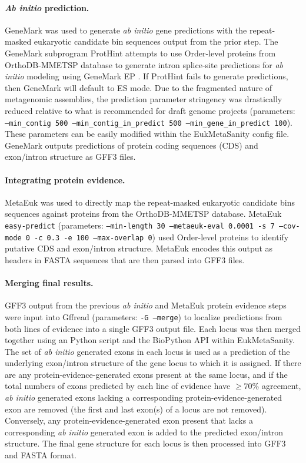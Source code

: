 \documentclass[12pt]{article}
\numberwithin{equation}{section}
\begin{document}
\paragraph{\textit{Ab initio} prediction.}  GeneMark \citep{Lomsadze2005} was used to generate \textit{ab initio} gene predictions with the repeat-masked eukaryotic candidate bin sequences output from the prior step. The GeneMark subprogram ProtHint attempts to use Order-level proteins from OrthoDB-MMETSP database to generate intron splice-site predictions for \textit{ab initio} modeling using GeneMark EP  \citep{Bruna2020}. If ProtHint fails to generate predictions, then GeneMark will default to ES mode. Due to the fragmented nature of metagenomic assemblies, the prediction parameter stringency was drastically reduced relative to what is recommended for draft genome projects (parameters: \texttt{--min\_contig 500 --min\_contig\_in\_predict 500 --min\_gene\_in\_predict 100}). These parameters can be easily modified within the EukMetaSanity config file. GeneMark outputs predictions of protein coding sequences (CDS) and exon/intron structure as GFF3 files. 


\paragraph{Integrating protein evidence.} MetaEuk \citep{LevyKarin2020} was used to directly map the repeat-masked eukaryotic candidate bins sequences against proteins from the OrthoDB-MMETSP database. MetaEuk \texttt{easy-predict} (parameters: \texttt{--min-length 30 --metaeuk-eval 0.0001 -s 7 --cov-mode 0 -c 0.3 -e 100 --max-overlap 0}) used Order-level proteins to identify putative CDS and exon/intron structure. MetaEuk encodes this output as headers in FASTA sequences that are then parsed into GFF3 files. 

\paragraph{Merging final results.} GFF3 output from the previous \textit{ab initio} and MetaEuk protein evidence steps were input into Gffread \citep{Pertea2020} (parameters: \texttt{-G --merge}) to localize predictions from both lines of evidence into a single GFF3 output file.  Each locus was then merged together using an  Python \citep{Python} script and the BioPython API \citep{BioPython} within EukMetaSanity. The set of \textit{ab initio} generated exons in each locus is used as a prediction of the underlying exon/intron structure of the gene locus to which it is assigned. If there are any protein-evidence-generated exons present at the same locus, and if the total numbers of exons predicted by each line of evidence have $\geq 70\%$ agreement, \textit{ab initio} generated exons lacking a corresponding protein-evidence-generated exon are removed (the first and last exon(s) of a locus are not removed). Conversely, any protein-evidence-generated exon present that lacks a corresponding \textit{ab initio} generated exon is added to the predicted exon/intron structure. The final gene structure for each locus is then processed into GFF3 and FASTA format.
\end{document}
